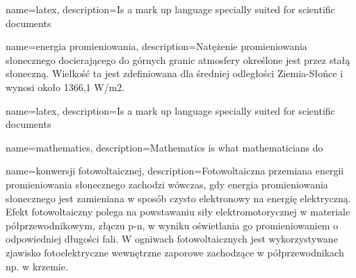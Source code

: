 {
    name=latex,
    description={Is a mark up language specially suited for scientific documents}
}

{
    name=energia promieniowania,
    description={Natężenie promieniowania słonecznego docierającego do górnych granic atmosfery określone jest przez stałą słoneczną. Wielkość ta jest zdefiniowana dla średniej odległości Ziemia-Słońce i wynosi około 1366,1 W/m2. }
}

\newglossaryentry{}
{
    name=latex,
    description={Is a mark up language specially suited for scientific documents}
}


{
    name=mathematics,
    description={Mathematics is what mathematicians do}
}

{
    name=konwersji fotowoltaicznej,
    description={Fotowoltaiczna przemiana energii promieniowania słonecznego zachodzi wówczas, gdy energia promieniowania słonecznego jest zamieniana w sposób czysto elektronowy na energię elektryczną. Efekt fotowoltaiczny polega na powstawaniu siły elektromotorycznej w materiale półprzewodnikowym, złączu p-n, w wyniku oświetlania go promieniowaniem o odpowiedniej długości fali. W ogniwach fotowoltaicznych jest wykorzystywane zjawisko fotoelektryczne wewnętrzne zaporowe zachodzące w półprzewodnikach np. w krzemie.}
}


